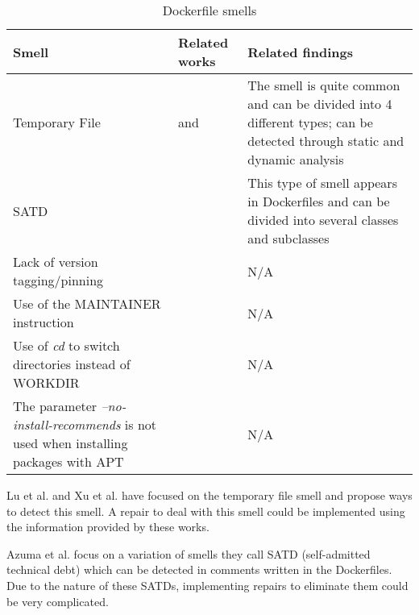 \begin{table}[H]
    \centering
    \begin{tabular}{|p{}|p{}|p{}|}
        \hline \textbf{Smell} & \textbf{Related works} & \textbf{Related findings} \\
        \hline Temporary File & \cite{luEmpiricalCaseStudy2019} and \cite{xuDockerfileTFSmell2019} & The smell is quite common and can be divided into 4 different types; can be detected through static and dynamic analysis \\
        \hline SATD & \cite{azumaEmpiricalStudySelfadmitted2022} & This type of smell appears in Dockerfiles and can be divided into several classes and subclasses \\
        \hline Lack of version tagging/pinning & \cite{wuCharacterizingOccurrenceDockerfile2020} & N/A \\
        \hline Use of the MAINTAINER instruction & \cite{wuCharacterizingOccurrenceDockerfile2020} & N/A \\
        \hline Use of \textit{cd} to switch directories instead of WORKDIR & \cite{wuCharacterizingOccurrenceDockerfile2020} & N/A \\
        \hline The parameter \textit{--no-install-recommends} is not used when installing packages with APT & \cite{wuCharacterizingOccurrenceDockerfile2020} & N/A \\
        \hline
    \end{tabular}
    \caption{Dockerfile smells}
    \label{tab:dockerfile_smells}
\end{table}


Lu et al. \cite{luEmpiricalCaseStudy2019} and Xu et al. \cite{xuDockerfileTFSmell2019} have focused on the temporary file smell and propose ways to detect this smell. A repair to deal with this smell could be implemented using the information provided by these works.

Azuma et al. \cite{azumaEmpiricalStudySelfadmitted2022} focus on a variation of smells they call SATD (self-admitted technical debt) which can be detected in comments written in the Dockerfiles. Due to the nature of these SATDs, implementing repairs to eliminate them could be very complicated.

